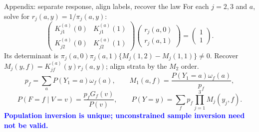 \documentclass[aspectratio=169,10pt]{beamer}
\newcommand{\bluekey}[1]{\textcolor{Blue}{\textbf{#1}}}
\begin{document}
\begin{frame}{Appendix: separate response, align labels, recover the law}
For each $j=2,3$ and $a$, solve for $r_j(a,y)=1/\pi_j(a,y)$:
\[
\begin{pmatrix}
K_{j1}^{(a)}(0)&K_{j1}^{(a)}(1)\\
K_{j2}^{(a)}(0)&K_{j2}^{(a)}(1)
\end{pmatrix}
\begin{pmatrix}r_j(a,0)\\r_j(a,1)\end{pmatrix}
=\begin{pmatrix}1\\1\end{pmatrix}.
\]
Its determinant is
$\pi_j(a,0)\pi_j(a,1)\{M_j(1,2)-M_j(1,1)\}\ne0$.
Recover $M_j(y,f)=K_{jf}^{(a)}(y)r_j(a,y)$; align strata by the $M_2$ order.
\[
p_f=\sum_aP(Y_1=a)\omega_f(a),\qquad
M_1(a,f)=\frac{P(Y_1=a)\omega_f(a)}{p_f},
\]
\[
P(F=f\mid V=v)=\frac{p_fG_f(v)}{P(v)},\qquad
P(Y=y)=\sum_f p_f\prod_{j=1}^3M_j(y_j,f).
\]
\bluekey{Population inversion is unique; unconstrained sample inversion need not be valid.}
\end{frame}
\end{document}
